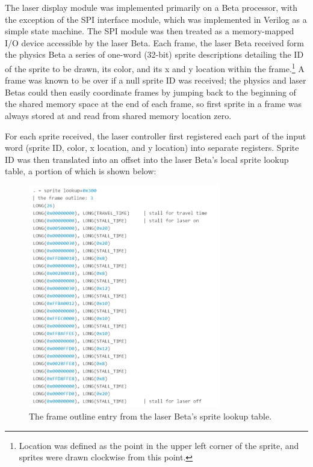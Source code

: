 \documentclass{article}
\begin{document}
The laser display module was implemented primarily on a Beta processor, with the exception of the SPI interface module, which was implemented in Verilog as a simple state machine. The SPI module was then treated as a memory-mapped I/O device accessible by the laser Beta. Each frame, the laser Beta received form the physics Beta a series of one-word (32-bit) sprite descriptions detailing the ID of the sprite to be drawn, its color, and its x and y location within the frame.\footnote{Location was defined as the point in the upper left corner of the sprite, and sprites were drawn clockwise from this point.} A frame was known to be over if a null sprite ID was received; the physics and laser Betas could then easily coordinate frames by jumping back to the beginning of the shared memory space at the end of each frame, so first sprite in a frame was always stored at and read from shared memory location zero.

	For each sprite received, the laser controller first registered each part of the input word (sprite ID, color, x location, and y location) into separate registers. Sprite ID was then translated into an offset into the laser Beta's local sprite lookup table, a portion of which is shown below:

\begin{figure}[H]
\begin{center}
\includegraphics[width=0.75\textwidth]{sprite_lookup_laser}
\caption{The frame outline entry from the laser Beta's sprite lookup table.}
\end{center}
\end{figure}
\end{document}
